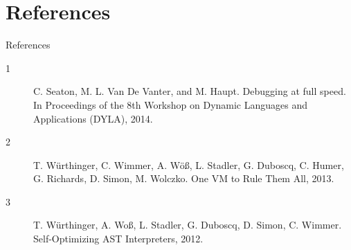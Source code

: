 \documentclass[xcolor=dvipsname,handout]{beamer}
\begin{document}
\section{References}

\begin{frame}{References}
  \begin{description}
    \item[1]{C. Seaton, M. L. Van De Vanter, and M. Haupt. Debugging at full speed. In Proceedings of the 8th Workshop on Dynamic Languages and Applications (DYLA), 2014.}
    \item[2] T. Würthinger, C. Wimmer, A. Wöß, L. Stadler, G. Duboscq, C. Humer, G. Richards, D. Simon, M. Wolczko. One VM to Rule Them All, 2013.
    \item[3] T. Würthinger, A. Woß, L. Stadler, G. Duboscq, D. Simon, C. Wimmer. Self-Optimizing AST Interpreters, 2012.
  \end{description}
\end{frame}
\end{document}
